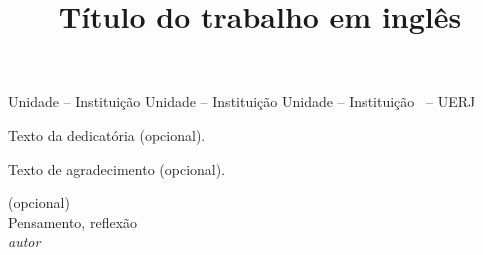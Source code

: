 \documentclass[a4paper,12pt,oneside,onecolumn,final,fleqn]{repUERJ}
\title{Título do trabalho em inglês}
\begin{document}

\frontmatter %

%
\capa
\folhaderosto
%
%
%
\fichacatalografica{}
%
%
\begin{folhadeaprovacao}
             {Unidade -- Instituição}
             {Unidade -- Instituição}
             {Unidade -- Instituição}
             {\UERJunidade \UERJunidadenome\ -- UERJ}
\end{folhadeaprovacao}
%
%
\vfill
Texto da dedicatória (opcional).
%
%

Texto de agradecimento (opcional).
%
%
\pretextualchapter{}
  \vfill
  \begin{flushright}
 (opcional)\\
 Pensamento, reflexão\\    
    \textit{autor}
  \end{flushright}
%
%
\end{document}
